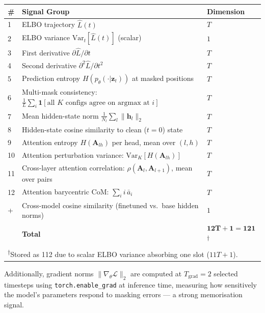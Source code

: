 \documentclass[11pt,a4paper]{article}
\begin{document}
\begin{center}
\small
\renewcommand{\arraystretch}{1.25}
\begin{tabular}{lll}
\toprule
\# & Signal Group & Dimension \\
\midrule
1 & ELBO trajectory $\hat{L}(t)$                    & $T$   \\
2 & ELBO variance $\mathrm{Var}_t[\hat{L}(t)]$ (scalar) & $1$ \\
3 & First derivative $\partial \hat{L}/\partial t$  & $T$   \\
4 & Second derivative $\partial^2 \hat{L}/\partial t^2$ & $T$ \\
5 & Prediction entropy $H(p_\theta(\cdot|\mathbf{z}_t))$ at masked positions & $T$ \\
6 & Multi-mask consistency: $\frac{1}{L}\sum_i \mathbf{1}[\text{all } K \text{ configs agree on argmax at } i]$ & $T$ \\
7 & Mean hidden-state norm $\frac{1}{N_l}\sum_l \|\mathbf{h}_l\|_2$           & $T$ \\
8 & Hidden-state cosine similarity to clean ($t{=}0$) state                   & $T$ \\
9 & Attention entropy $H(\mathbf{A}_{lh})$ per head, mean over $(l,h)$ \quad [AttenMIA] & $T$ \\
10 & Attention perturbation variance: $\mathrm{Var}_K[H(\mathbf{A}_{lh})]$ \quad [AttenMIA] & $T$ \\
11 & Cross-layer attention correlation: $\rho(\mathbf{A}_l, \mathbf{A}_{l+1})$, mean over pairs \quad [AttenMIA] & $T$ \\
12 & Attention barycentric CoM: $\sum_i i\,\bar{a}_i$ \quad [AttenMIA]       & $T$ \\
\midrule
+ & Cross-model cosine similarity (finetuned vs.\ base hidden norms) & $1$ \\
\midrule
  & \textbf{Total} & $\mathbf{12T + 1 = 121}$\textsuperscript{$\dagger$} \\
\bottomrule
\multicolumn{3}{l}{\textsuperscript{$\dagger$}Stored as 112 due to scalar ELBO variance absorbing one slot ($11T + 1$).}
\end{tabular}
\end{center}

Additionally, gradient norms $\|\nabla_\theta \mathcal{L}\|_2$ are computed at
$T_{\text{grad}}=2$ selected timesteps using \texttt{torch.enable\_grad} at
inference time, measuring how sensitively the model's parameters respond to
masking errors — a strong memorisation signal.
\end{document}

